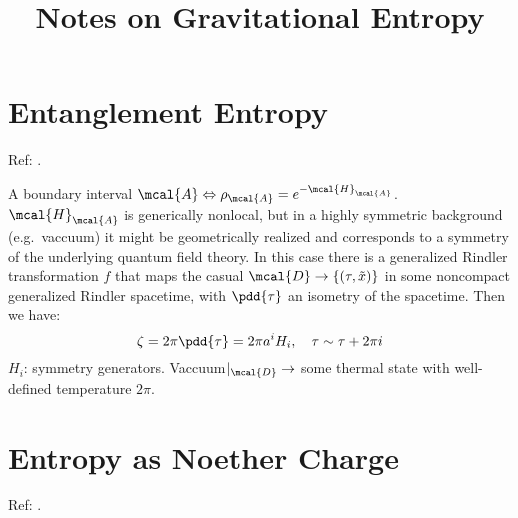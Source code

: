\documentclass[a4paper
	,10pt
]{article}
\title{Notes on Gravitational Entropy}
\begin{document}
\maketitle
{}
\thispagestyle{empty}


\setlength{\parskip}{.1\baselineskip}
\tableofcontents
\setlength{\parskip}{\parskipnorm}

\section{Entanglement Entropy}
	Ref: \textcite{Apolo:2020qjm}.
	
	A boundary interval $\mcal{A} \Leftrightarrow \rho_\mcal{A} = e^{-\mcal{H}_\mcal{A}}$. $\mcal{H}_\mcal{A}$ is generically nonlocal, but in a highly symmetric background (e.g.~vaccuum) it might be geometrically realized and corresponds to a symmetry of the underlying quantum field theory.
	In this case there is a generalized Rindler transformation $f$ that maps the casual $\mcal{D} \to \{(\tau,\tilde{x})\}$ in some noncompact generalized Rindler spacetime, with $\pdd{\tau}$ an isometry of the spacetime. Then we have:
	\begin{equation}
		\zeta = 2\pi \pdd{\tau}
		= 2\pi a^i H_i,
	\quad
		\tau \sim \tau + 2\pi i
	\end{equation}
	$H_i$: symmetry generators. Vaccuum$|_\mcal{D}\to$ some thermal state with well-defined temperature $2\pi$. 
	
	
\section{Entropy as Noether Charge}
	Ref: \textcite{Wald:1993nt,Lewkowycz:2013nqa,Faulkner:2013ana}. 
	
	

\vspace{1.2\baselineskip}
\raggedright
\printbibliography[%
	,heading = bibintoc
]
\end{document}

